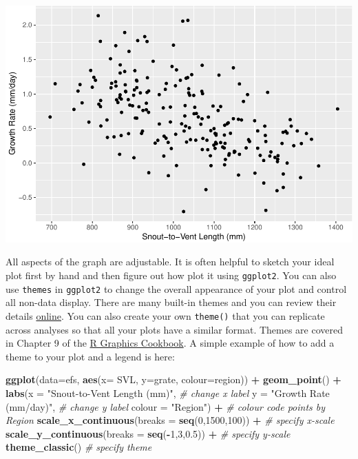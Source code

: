 \documentclass[
]{book}
\newenvironment{Shaded}{\begin{snugshade}}{\end{snugshade}}
\newcommand{\AttributeTok}[1]{\textcolor[rgb]{0.13,0.29,0.53}{#1}}
\newcommand{\CommentTok}[1]{\textcolor[rgb]{0.56,0.35,0.01}{\textit{#1}}}
\newcommand{\DecValTok}[1]{\textcolor[rgb]{0.00,0.00,0.81}{#1}}
\newcommand{\FloatTok}[1]{\textcolor[rgb]{0.00,0.00,0.81}{#1}}
\newcommand{\FunctionTok}[1]{\textcolor[rgb]{0.13,0.29,0.53}{\textbf{#1}}}
\newcommand{\NormalTok}[1]{#1}
\newcommand{\SpecialCharTok}[1]{\textcolor[rgb]{0.81,0.36,0.00}{\textbf{#1}}}
\newcommand{\StringTok}[1]{\textcolor[rgb]{0.31,0.60,0.02}{#1}}
\begin{document}
\includegraphics{series_files/figure-latex/unnamed-chunk-25-1.pdf}

All aspects of the graph are adjustable. It is often helpful to sketch your ideal plot first by hand and then figure out how plot it using \texttt{ggplot2}. You can also use \texttt{themes} in \texttt{ggplot2} to change the overall appearance of your plot and control all non-data display. There are many built-in themes and you can review their details \href{https://ggplot2.tidyverse.org/reference/ggtheme.html}{online}. You can also create your own \texttt{theme()} that you can replicate across analyses so that all your plots have a similar format. Themes are covered in Chapter 9 of the \href{https://r-graphics.org/}{R Graphics Cookbook}. A simple example of how to add a theme to your plot and a legend is here:

\begin{Shaded}
\begin{Highlighting}[]
\FunctionTok{ggplot}\NormalTok{(}\AttributeTok{data=}\NormalTok{efs, }\FunctionTok{aes}\NormalTok{(}\AttributeTok{x=}\NormalTok{ SVL, }\AttributeTok{y=}\NormalTok{grate, }\AttributeTok{colour=}\NormalTok{region)) }\SpecialCharTok{+}   
    \FunctionTok{geom\_point}\NormalTok{() }\SpecialCharTok{+}
    \FunctionTok{labs}\NormalTok{(}\AttributeTok{x =} \StringTok{"Snout{-}to{-}Vent Length (mm)"}\NormalTok{,  }\CommentTok{\# change x label}
         \AttributeTok{y =} \StringTok{"Growth Rate (mm/day)"}\NormalTok{,  }\CommentTok{\# change y label}
         \AttributeTok{colour =} \StringTok{"Region"}\NormalTok{) }\SpecialCharTok{+} \CommentTok{\# colour code points by Region}
    \FunctionTok{scale\_x\_continuous}\NormalTok{(}\AttributeTok{breaks =} \FunctionTok{seq}\NormalTok{(}\DecValTok{0}\NormalTok{,}\DecValTok{1500}\NormalTok{,}\DecValTok{100}\NormalTok{)) }\SpecialCharTok{+}  \CommentTok{\# specify x{-}scale}
    \FunctionTok{scale\_y\_continuous}\NormalTok{(}\AttributeTok{breaks =} \FunctionTok{seq}\NormalTok{(}\SpecialCharTok{{-}}\DecValTok{1}\NormalTok{,}\DecValTok{3}\NormalTok{,}\FloatTok{0.5}\NormalTok{)) }\SpecialCharTok{+}  \CommentTok{\# specify y{-}scale}
    \FunctionTok{theme\_classic}\NormalTok{()  }\CommentTok{\# specify theme}
\end{Highlighting}
\end{Shaded}
\end{document}
